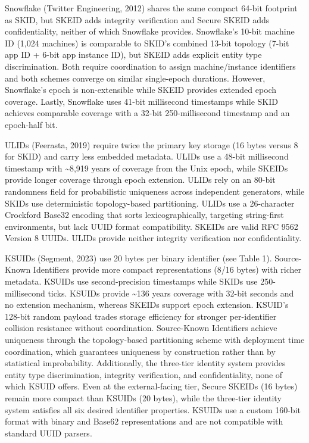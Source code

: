 \documentclass[fleqn,10pt,lineno]{wlpeerj}
\newcounter{none} %
\begin{document}
Snowflake (Twitter Engineering, 2012) shares the same compact 64-bit
footprint as SKID, but SKEID adds integrity verification and Secure
SKEID adds confidentiality, neither of which Snowflake provides.
Snowflake's 10-bit machine ID (1,024 machines) is comparable to SKID's
combined 13-bit topology (7-bit app ID + 6-bit app instance ID), but
SKEID adds explicit entity type discrimination. Both require
coordination to assign machine/instance identifiers and both schemes
converge on similar single-epoch durations. However, Snowflake's epoch
is non-extensible while SKEID provides extended epoch coverage. Lastly,
Snowflake uses 41-bit millisecond timestamps while SKID achieves
comparable coverage with a 32-bit 250-millisecond timestamp and an
epoch-half bit.

ULIDs (Feerasta, 2019) require twice the primary key storage (16 bytes
versus 8 for SKID) and carry less embedded metadata. ULIDs use a 48-bit
millisecond timestamp with \textasciitilde8,919 years of coverage from
the Unix epoch, while SKEIDs provide longer coverage through epoch
extension. ULIDs rely on an 80-bit randomness field for probabilistic
uniqueness across independent generators, while SKIDs use deterministic
topology-based partitioning. ULIDs use a 26-character Crockford Base32
encoding that sorts lexicographically, targeting string-first
environments, but lack UUID format compatibility. SKEIDs are valid RFC
9562 Version 8 UUIDs. ULIDs provide neither integrity verification nor
confidentiality.

KSUIDs (Segment, 2023) use 20 bytes per binary identifier (see Table 1).
Source-Known Identifiers provide more compact representations (8/16
bytes) with richer metadata. KSUIDs use second-precision timestamps
while SKIDs use 250-millisecond ticks. KSUIDs provide \textasciitilde136
years coverage with 32-bit seconds and no extension mechanism, whereas
SKEIDs support epoch extension. KSUID's 128-bit random payload trades
storage efficiency for stronger per-identifier collision resistance
without coordination. Source-Known Identifiers achieve uniqueness
through the topology-based partitioning scheme with deployment time
coordination, which guarantees uniqueness by construction rather than by
statistical improbability. Additionally, the three-tier identity system
provides entity type discrimination, integrity verification, and
confidentiality, none of which KSUID offers. Even at the external-facing
tier, Secure SKEIDs (16 bytes) remain more compact than KSUIDs (20
bytes), while the three-tier identity system satisfies all six desired
identifier properties. KSUIDs use a custom 160-bit format with binary
and Base62 representations and are not compatible with standard UUID
parsers.
\end{document}
